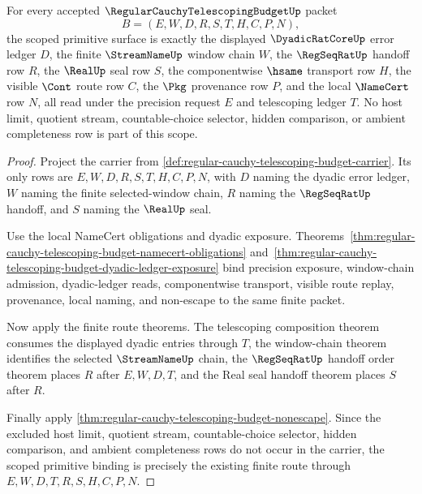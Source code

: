 \begin{theorem}
\label{thm:regular-cauchy-telescoping-budget-primitive-scope-binding}
For every accepted $\RegularCauchyTelescopingBudgetUp$ packet
$$
B=(E,W,D,R,S,T,H,C,P,N),
$$
the scoped primitive surface is exactly the displayed $\DyadicRatCoreUp$ error ledger $D$, the finite $\StreamNameUp$ window chain $W$, the $\RegSeqRatUp$ handoff row $R$, the $\RealUp$ seal row $S$, the componentwise $\hsame$ transport row $H$, the visible $\Cont$ route row $C$, the $\Pkg$ provenance row $P$, and the local $\NameCert$ row $N$, all read under the precision request $E$ and telescoping ledger $T$. No host limit, quotient stream, countable-choice selector, hidden comparison, or ambient completeness row is part of this scope.
\end{theorem}
\begin{proof}
Project the carrier from \autoref{def:regular-cauchy-telescoping-budget-carrier}. Its only rows are $E,W,D,R,S,T,H,C,P,N$, with $D$ naming the dyadic error ledger, $W$ naming the finite selected-window chain, $R$ naming the $\RegSeqRatUp$ handoff, and $S$ naming the $\RealUp$ seal.

Use the local NameCert obligations and dyadic exposure. Theorems~\ref{thm:regular-cauchy-telescoping-budget-namecert-obligations} and~\ref{thm:regular-cauchy-telescoping-budget-dyadic-ledger-exposure} bind precision exposure, window-chain admission, dyadic-ledger reads, componentwise transport, visible route replay, provenance, local naming, and non-escape to the same finite packet.

Now apply the finite route theorems. The telescoping composition theorem consumes the displayed dyadic entries through $T$, the window-chain theorem identifies the selected $\StreamNameUp$ chain, the $\RegSeqRatUp$ handoff order theorem places $R$ after $E,W,D,T$, and the Real seal handoff theorem places $S$ after $R$.

Finally apply \autoref{thm:regular-cauchy-telescoping-budget-nonescape}. Since the excluded host limit, quotient stream, countable-choice selector, hidden comparison, and ambient completeness rows do not occur in the carrier, the scoped primitive binding is precisely the existing finite route through $E,W,D,T,R,S,H,C,P,N$.
\end{proof}


